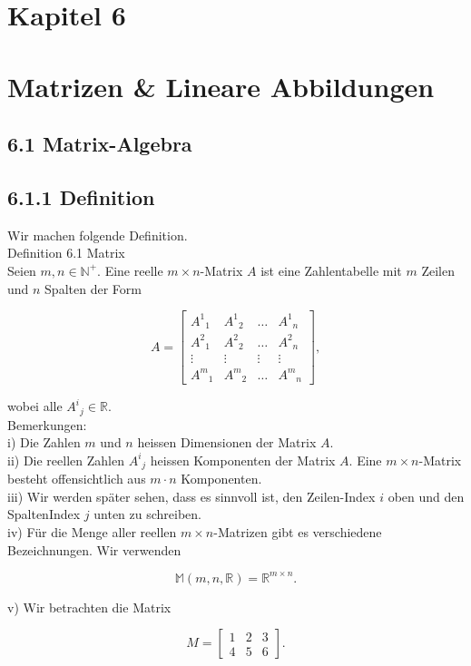 \documentclass[10pt]{article}
\begin{document}
\section*{Kapitel 6}
\section*{Matrizen \& Lineare Abbildungen}
\subsection*{6.1 Matrix-Algebra}
\subsection*{6.1.1 Definition}
Wir machen folgende Definition.\\
Definition 6.1 Matrix\\
Seien $m, n \in \mathbb{N}^{+}$. Eine reelle $m \times n$-Matrix $A$ ist eine Zahlentabelle mit $m$ Zeilen und $n$ Spalten der Form

\[
A=\left[\begin{array}{llll}
A^{1}{ }_{1} & A^{1}{ }_{2} & \ldots & A^{1}{ }_{n}  \tag{6.1}\\
A^{2}{ }_{1} & A^{2}{ }_{2} & \ldots & A^{2}{ }_{n} \\
\vdots & \vdots & \vdots & \vdots \\
A^{m}{ }_{1} & A^{m}{ }_{2} & \ldots & A^{m}{ }_{n}
\end{array}\right],
\]

wobei alle $A^{i}{ }_{j} \in \mathbb{R}$.\\
Bemerkungen:\\
i) Die Zahlen $m$ und $n$ heissen Dimensionen der Matrix $A$.\\
ii) Die reellen Zahlen $A^{i}{ }_{j}$ heissen Komponenten der Matrix $A$. Eine $m \times n$-Matrix besteht offensichtlich aus $m \cdot n$ Komponenten.\\
iii) Wir werden später sehen, dass es sinnvoll ist, den Zeilen-Index $i$ oben und den SpaltenIndex $j$ unten zu schreiben.\\
iv) Für die Menge aller reellen $m \times n$-Matrizen gibt es verschiedene Bezeichnungen. Wir verwenden


\begin{equation*}
\mathbb{M}(m, n, \mathbb{R})=\mathbb{R}^{m \times n} . \tag{6.2}
\end{equation*}


v) Wir betrachten die Matrix

\[
M=\left[\begin{array}{lll}
1 & 2 & 3  \tag{6.3}\\
4 & 5 & 6
\end{array}\right] .
\]
\end{document}
